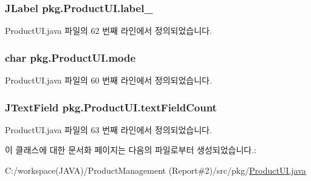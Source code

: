 \subsubsection[{\texorpdfstring{label\+\_\+6}{label_6}}]{\setlength{\rightskip}{0pt plus 5cm}J\+Label pkg.\+Product\+U\+I.\+label\+\_\hspace{0.3cm}{\ttfamily [private]}}\hypertarget{classpkg_1_1_product_u_i_abb15458ba8937c88a1f759023182929b}{}\label{classpkg_1_1_product_u_i_abb15458ba8937c88a1f759023182929b}


Product\+U\+I.\+java 파일의 62 번째 라인에서 정의되었습니다.

\subsubsection[{\texorpdfstring{mode}{mode}}]{\setlength{\rightskip}{0pt plus 5cm}char pkg.\+Product\+U\+I.\+mode\hspace{0.3cm}{\ttfamily [private]}}\hypertarget{classpkg_1_1_product_u_i_a345f05a195b28c741bb8227ded5873fa}{}\label{classpkg_1_1_product_u_i_a345f05a195b28c741bb8227ded5873fa}


Product\+U\+I.\+java 파일의 60 번째 라인에서 정의되었습니다.

\subsubsection[{\texorpdfstring{text\+Field\+Count}{textFieldCount}}]{\setlength{\rightskip}{0pt plus 5cm}J\+Text\+Field pkg.\+Product\+U\+I.\+text\+Field\+Count\hspace{0.3cm}{\ttfamily [private]}}\hypertarget{classpkg_1_1_product_u_i_ac35d0e67c152e5bcc6cdf3b9cc79f90b}{}\label{classpkg_1_1_product_u_i_ac35d0e67c152e5bcc6cdf3b9cc79f90b}


Product\+U\+I.\+java 파일의 63 번째 라인에서 정의되었습니다.



이 클래스에 대한 문서화 페이지는 다음의 파일로부터 생성되었습니다.\+:\begin{DoxyCompactItemize}
\item 
C\+:/workspace(\+J\+A\+V\+A)/\+Product\+Management (\+Report\#2)/src/pkg/\hyperlink{_product_u_i_8java}{Product\+U\+I.\+java}\end{DoxyCompactItemize}
